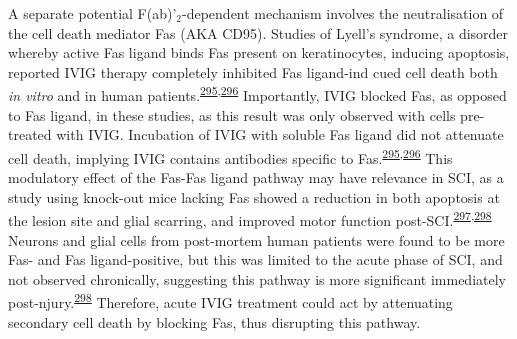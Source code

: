 \documentclass[
]{article}
\begin{document}
A separate potential F(ab)'\(_2\)-dependent mechanism involves the neutralisation of the cell death mediator Fas (AKA CD95).
Studies of Lyell's syndrome, a disorder whereby active Fas ligand binds Fas present on keratinocytes, inducing apoptosis, reported IVIG therapy completely inhibited Fas ligand-ind cued cell death both \emph{in vitro} and in human patients.\textsuperscript{\protect\hyperlink{ref-viard_inhibition_1998}{295},\protect\hyperlink{ref-altznauer_concurrent_2003}{296}}
Importantly, IVIG blocked Fas, as opposed to Fas ligand, in these studies, as this result was only observed with cells pre-treated with IVIG.
Incubation of IVIG with soluble Fas ligand did not attenuate cell death, implying IVIG contains antibodies specific to Fas.\textsuperscript{\protect\hyperlink{ref-viard_inhibition_1998}{295},\protect\hyperlink{ref-altznauer_concurrent_2003}{296}}
This modulatory effect of the Fas-Fas ligand pathway may have relevance in SCI, as a study using knock-out mice lacking Fas showed a reduction in both apoptosis at the lesion site and glial scarring, and improved motor function post-SCI.\textsuperscript{\protect\hyperlink{ref-sobrido-camean_role_2018}{297},\protect\hyperlink{ref-yu_fasfasl-mediated_2011}{298}}
Neurons and glial cells from post-mortem human patients were found to be more Fas- and Fas ligand-positive, but this was limited to the acute phase of SCI, and not observed chronically, suggesting this pathway is more significant immediately post-njury.\textsuperscript{\protect\hyperlink{ref-yu_fasfasl-mediated_2011}{298}}
Therefore, acute IVIG treatment could act by attenuating secondary cell death by blocking Fas, thus disrupting this pathway.
\end{document}
